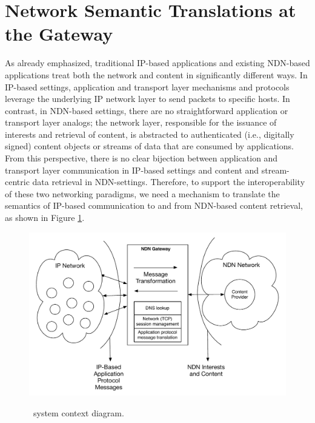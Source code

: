 \section{Network Semantic Translations at the Gateway} \label{sec:gateway}
As already emphasized, traditional IP-based applications and existing NDN-based applications treat both the network and content in significantly different ways. In IP-based settings, application and transport layer mechanisms and protocols leverage the underlying IP network layer to send packets to specific hosts. In contrast, in NDN-based settings, there are no straightforward application or transport layer analogs; the network layer, responsible for the issuance of interests and retrieval of content, is abstracted to authenticated (i.e., digitally signed) content objects or streams of data that are consumed by applications. From this perspective, there is no clear bijection between application and transport layer communication in IP-based settings and content and stream-centric data retrieval in NDN-settings. Therefore, to support the interoperability of these two networking paradigms, we need a mechanism to translate the semantics of IP-based communication to and from NDN-based content retrieval, as shown in Figure \ref{fig:translation}. 

\begin{figure}[ht!]
\begin{center}
\includegraphics[scale=0.5]{./images/gateway_highlevel.pdf}
\label{fig:translation}
\caption{\sink\ system context diagram.}
\end{center}
\end{figure}

